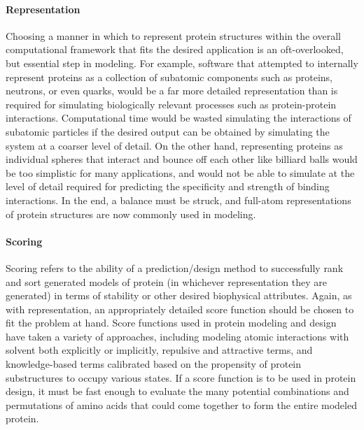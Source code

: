 \paragraph{Representation}
Choosing a manner in which to represent protein structures within the overall computational framework that fits the desired application is an oft-overlooked, but essential step in modeling.
For example, software that attempted to internally represent proteins as a collection of subatomic components such as proteins, neutrons, or even quarks, would be a far more detailed representation than is required for simulating biologically relevant processes such as protein-protein interactions.
Computational time would be wasted simulating the interactions of subatomic particles if the desired output can be obtained by simulating the system at a coarser level of detail.
On the other hand, representing proteins as individual spheres that interact and bounce off each other like billiard balls would be too simplistic for many applications, and would not be able to simulate at the level of detail required for predicting the specificity and strength of binding interactions.
In the end, a balance must be struck, and full-atom representations of protein structures are now commonly used in modeling.

\paragraph{Scoring}
Scoring refers to the ability of a prediction/design method to successfully rank and sort generated models of protein (in whichever representation they are generated) in terms of stability or other desired biophysical attributes.
Again, as with representation, an appropriately detailed score function should be chosen to fit the problem at hand.
Score functions used in protein modeling and design have taken a variety of approaches, including modeling atomic interactions with solvent both explicitly\cite{duan_pointcharge_2003,brooks_charmm:_2009} or implicitly\cite{lazaridis_effective_1999}, repulsive and attractive terms\cite{lennard-jones_determination_1924}, and knowledge-based terms calibrated based on the propensity of protein substructures to occupy various states\cite{rohl_protein_2004}.
If a score function is to be used in protein design, it must be fast enough to evaluate the many potential combinations and permutations of amino acids that could come together to form the entire modeled protein.

